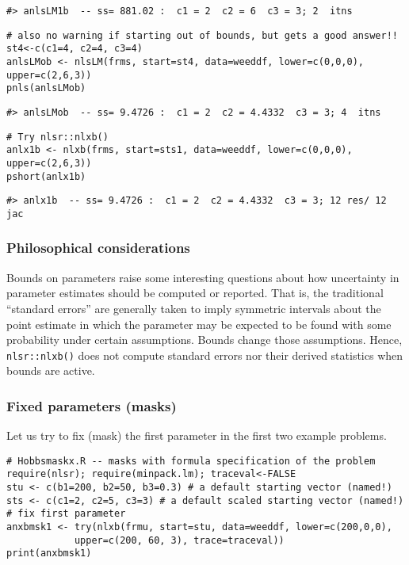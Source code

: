 \begin{verbatim}
#> anlsLM1b  -- ss= 881.02 :  c1 = 2  c2 = 6  c3 = 3; 2  itns
\end{verbatim}

\begin{verbatim}
# also no warning if starting out of bounds, but gets a good answer!!
st4<-c(c1=4, c2=4, c3=4)
anlsLMob <- nlsLM(frms, start=st4, data=weeddf, lower=c(0,0,0), upper=c(2,6,3))
pnls(anlsLMob)
\end{verbatim}

\begin{verbatim}
#> anlsLMob  -- ss= 9.4726 :  c1 = 2  c2 = 4.4332  c3 = 3; 4  itns
\end{verbatim}

\begin{verbatim}
# Try nlsr::nlxb()
anlx1b <- nlxb(frms, start=sts1, data=weeddf, lower=c(0,0,0), upper=c(2,6,3))
pshort(anlx1b)
\end{verbatim}

\begin{verbatim}
#> anlx1b  -- ss= 9.4726 :  c1 = 2  c2 = 4.4332  c3 = 3; 12 res/ 12 jac
\end{verbatim}

\hypertarget{philosophical-considerations}{%
\subsubsection{Philosophical considerations}\label{philosophical-considerations}}

Bounds on parameters raise some interesting questions about how
uncertainty in parameter estimates should be computed or reported. That is, the
traditional ``standard errors'' are generally taken to imply symmetric intervals about
the point estimate in which the parameter may be expected to be found with some
probability under certain assumptions.
Bounds change those assumptions. Hence, \texttt{nlsr::nlxb()} does not compute standard
errors nor their derived statistics when bounds are active.

\hypertarget{fixed-parameters-masks}{%
\subsubsection{Fixed parameters (masks)}\label{fixed-parameters-masks}}

Let us try to fix (mask) the first parameter in the first two example problems.

\begin{verbatim}
# Hobbsmaskx.R -- masks with formula specification of the problem
require(nlsr); require(minpack.lm); traceval<-FALSE
stu <- c(b1=200, b2=50, b3=0.3) # a default starting vector (named!)
sts <- c(c1=2, c2=5, c3=3) # a default scaled starting vector (named!)
# fix first parameter
anxbmsk1 <- try(nlxb(frmu, start=stu, data=weeddf, lower=c(200,0,0), 
            upper=c(200, 60, 3), trace=traceval))
print(anxbmsk1)
\end{verbatim}

